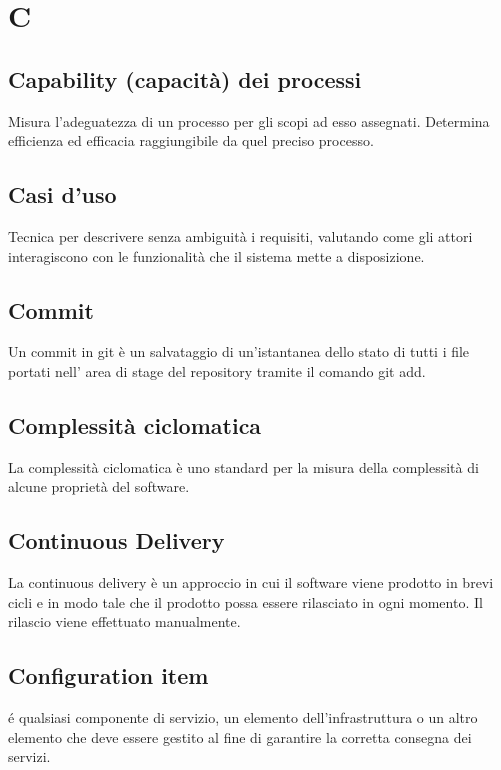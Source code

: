 	\section{C}
	\subsection{Capability (capacità) dei processi}
	Misura l'adeguatezza di un processo per gli scopi ad esso assegnati. Determina efficienza ed efficacia raggiungibile da quel preciso processo.
	
	\subsection{Casi d'uso}
	Tecnica per descrivere senza ambiguità i requisiti, valutando come gli attori interagiscono con le funzionalità che il sistema mette a disposizione.
		
	\subsection{Commit}
	Un commit in git è un salvataggio di un'istantanea dello stato di tutti i file portati nell' area di stage del repository tramite il comando git add.
	
	\subsection{Complessità ciclomatica}
	La complessità ciclomatica è uno standard per la misura della complessità di alcune proprietà del software.
	\subsection{Continuous Delivery}
	La continuous delivery è un approccio in cui il software viene prodotto in brevi cicli e in modo tale che il prodotto possa essere rilasciato in ogni momento. Il rilascio viene effettuato manualmente.
	
	\subsection{Configuration item}
	é qualsiasi componente di servizio, un elemento dell'infrastruttura o un altro elemento che deve essere gestito al fine di garantire la corretta consegna dei servizi.
	
